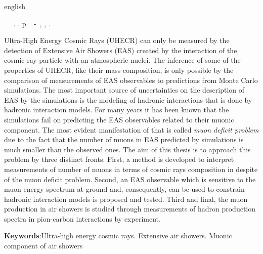 \begin{resumo}[Abstract]        
 \begin{otherlanguage*}{english}
	\begin{flushleft} 
		\setlength{\absparsep}{0pt} %
 		\SingleSpacing 
 		\imprimirautorabr~ ~\textbf{\imprimirtitulo}. \imprimirdata.  \pageref{LastPage}p. 
		\imprimirtipotrabalho~-~\imprimirinstituicao, \imprimirlocal, 	\imprimirdata. 
 	\end{flushleft}
	\OnehalfSpacing 

Ultra-High Energy Cosmic Rays (UHECR) can only be measured by the detection of
Extensive Air Showers (EAS) created by the interaction of the cosmic ray particle
with an atmospheric nuclei. The inference of some of the properties of UHECR,
like their mass composition, is only possible by the comparison of measurements
of EAS observables to predictions from Monte Carlo simulations.
The most important source of uncertainties on the description of EAS by the simulations
is the modeling of hadronic interactions that is done by hadronic interaction models.
For many years it has been known that the simulations fail on predicting the EAS
observables related to their muonic component. The most evident manifestation of that is
called \emph{muon deficit problem} due to the fact that the number of muons in EAS
predicted by simulations is much smaller than the observed ones.
The aim of this thesis is to approach this problem by three distinct fronts.
First, a method is developed to interpret measurements of number of muons in terms
of cosmic rays composition in despite of the muon deficit problem.
Second, an EAS observable which is sensitive to the muon energy spectrum at ground
and, consequently, can be used to constrain hadronic interaction models is proposed
and tested. Third and final, the muon production in air showers is studied through
measurements of hadron production spectra in pion-carbon interactions
by \NASixtyOne experiment.  

   \vspace{\onelineskip}
 
   \noindent 
   \textbf{Keywords}:Ultra-high energy cosmic rays. Extensive air showers. Muonic component of air showers
 \end{otherlanguage*}
\end{resumo}
